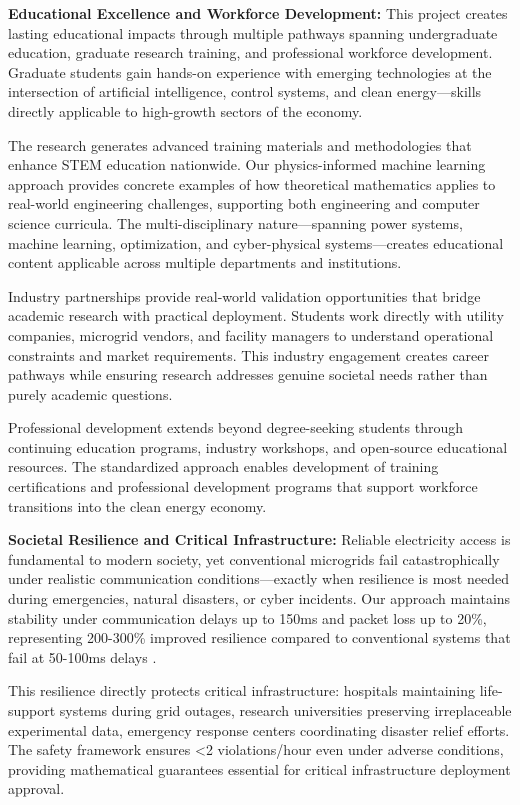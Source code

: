\textbf{Educational Excellence and Workforce Development:} This project creates lasting educational impacts through multiple pathways spanning undergraduate education, graduate research training, and professional workforce development. Graduate students gain hands-on experience with emerging technologies at the intersection of artificial intelligence, control systems, and clean energy—skills directly applicable to high-growth sectors of the economy.

The research generates advanced training materials and methodologies that enhance STEM education nationwide. Our physics-informed machine learning approach provides concrete examples of how theoretical mathematics applies to real-world engineering challenges, supporting both engineering and computer science curricula. The multi-disciplinary nature—spanning power systems, machine learning, optimization, and cyber-physical systems—creates educational content applicable across multiple departments and institutions.

Industry partnerships provide real-world validation opportunities that bridge academic research with practical deployment. Students work directly with utility companies, microgrid vendors, and facility managers to understand operational constraints and market requirements. This industry engagement creates career pathways while ensuring research addresses genuine societal needs rather than purely academic questions.

Professional development extends beyond degree-seeking students through continuing education programs, industry workshops, and open-source educational resources. The standardized approach enables development of training certifications and professional development programs that support workforce transitions into the clean energy economy.

\textbf{Societal Resilience and Critical Infrastructure:} Reliable electricity access is fundamental to modern society, yet conventional microgrids fail catastrophically under realistic communication conditions—exactly when resilience is most needed during emergencies, natural disasters, or cyber incidents. Our approach maintains stability under communication delays up to 150ms and packet loss up to 20\%, representing 200-300\% improved resilience compared to conventional systems that fail at 50-100ms delays \cite{baseline2023delay}.

This resilience directly protects critical infrastructure: hospitals maintaining life-support systems during grid outages, research universities preserving irreplaceable experimental data, emergency response centers coordinating disaster relief efforts. The safety framework ensures <2 violations/hour even under adverse conditions, providing mathematical guarantees essential for critical infrastructure deployment approval.

